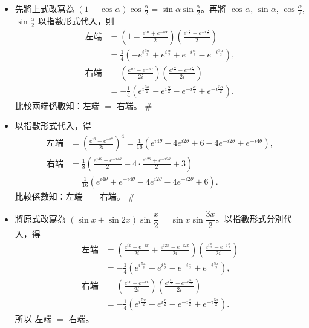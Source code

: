 \begin{solution}
\begin{itemize}
  \item[(i)] 先將上式改寫為 $(1-\cos\alpha)\cos\frac{\alpha}{2} = \sin\alpha\sin\frac{\alpha}{2}$。再將 $\cos\alpha$, $\sin\alpha$, $\cos\frac{\alpha}{2}$, $\sin\frac{\alpha}{2}$ 以指數形式代入，則
  \begin{align*}
  \text{左端} &= \left(1-\frac{e^{i\alpha}+e^{-i\alpha}}{2}\right)\left(\frac{e^{i\frac{\alpha}{2}}+e^{-i\frac{\alpha}{2}}}{2}\right) \\
  &= \frac{1}{4}\left(-e^{i\frac{3\alpha}{2}}+e^{i\frac{\alpha}{2}}+e^{-i\frac{\alpha}{2}}-e^{-i\frac{3\alpha}{2}}\right), \\
  \text{右端} &= \left(\frac{e^{i\alpha}-e^{-i\alpha}}{2i}\right)\left(\frac{e^{i\frac{\alpha}{2}}-e^{-i\frac{\alpha}{2}}}{2i}\right) \\
  &= -\frac{1}{4}\left(e^{i\frac{3\alpha}{2}}-e^{i\frac{\alpha}{2}}-e^{-i\frac{\alpha}{2}}+e^{-i\frac{3\alpha}{2}}\right).
  \end{align*}
  比較兩端係數知：左端 $=$ 右端。 \hfill\#

  \item[(ii)] 以指數形式代入，得
  \begin{align*}
  \text{左端} &= \left(\frac{e^{i\theta}-e^{-i\theta}}{2i}\right)^4 = \frac{1}{16}(e^{i 4\theta}-4e^{i 2\theta}+6-4e^{-i 2\theta}+e^{-i 4\theta}), \\
  \text{右端} &= \frac{1}{8}\left(\frac{e^{i 4\theta}+e^{-i 4\theta}}{2} - 4\cdot\frac{e^{i 2\theta}+e^{-i 2\theta}}{2} + 3\right) \\
  &= \frac{1}{16}(e^{i 4\theta}+e^{-i 4\theta}-4e^{i 2\theta}-4e^{-i 2\theta}+6).
  \end{align*}
  比較係數知：左端 $=$ 右端。 \hfill\#

  \item[(iii)] 將原式改寫為 $(\sin x+\sin 2x)\sin\dfrac{x}{2} = \sin x\sin\dfrac{3x}{2}$。以指數形式分別代入，得
  \begin{align*}
  \text{左端} &= \left(\frac{e^{ix}-e^{-ix}}{2i} + \frac{e^{i 2x}-e^{-i 2x}}{2i}\right)\left(\frac{e^{i\frac{x}{2}}-e^{-i\frac{x}{2}}}{2i}\right) \\
  &= -\frac{1}{4}\left(e^{i\frac{5x}{2}}-e^{i\frac{x}{2}}-e^{-i\frac{x}{2}}+e^{-i\frac{5x}{2}}\right), \\
  \text{右端} &= \left(\frac{e^{ix}-e^{-ix}}{2i}\right)\left(\frac{e^{i\frac{3x}{2}}-e^{-i\frac{3x}{2}}}{2i}\right) \\
  &= -\frac{1}{4}\left(e^{i\frac{5x}{2}}-e^{i\frac{x}{2}}-e^{-i\frac{x}{2}}+e^{-i\frac{5x}{2}}\right).
  \end{align*}
  所以 左端 $=$ 右端。 \qedhere
\end{itemize}
\end{solution}

